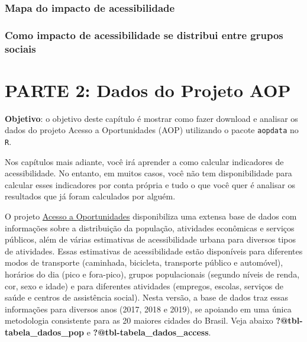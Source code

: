 \documentclass[
  letterpaper,
  DIV=11,
  numbers=noendperiod]{scrreprt}
\begin{document}
\hypertarget{mapa-do-impacto-de-acessibilidade}{%
\section{Mapa do impacto de
acessibilidade}\label{mapa-do-impacto-de-acessibilidade}}

\hypertarget{como-impacto-de-acessibilidade-se-distribui-entre-grupos-sociais}{%
\section{Como impacto de acessibilidade se distribui entre grupos
sociais}\label{como-impacto-de-acessibilidade-se-distribui-entre-grupos-sociais}}

\part{PARTE 2: Dados do Projeto AOP}

\textbf{Objetivo}: o objetivo deste capítulo é mostrar como fazer
download e analisar os dados do projeto Acesso a Oportunidades (AOP)
utilizando o pacote \texttt{aopdata} no \texttt{R}.

Nos capítulos mais adiante, você irá aprender a como calcular
indicadores de acessibilidade. No entanto, em muitos casos, você não tem
disponibilidade para calcular esses indicadores por conta própria e tudo
o que você quer é analisar os resultados que já foram calculados por
alguém.

O projeto \href{https://www.ipea.gov.br/acessooportunidades/}{Acesso a
Oportunidades} disponibiliza uma extensa base de dados com informações
sobre a distribuição da população, atividades econômicas e serviços
públicos, além de várias estimativas de acessibilidade urbana para
diversos tipos de atividades. Essas estimativas de acessibilidade estão
disponíveis para diferentes modos de transporte (caminhada, bicicleta,
transporte público e automóvel), horários do dia (pico e fora-pico),
grupos populacionais (segundo níveis de renda, cor, sexo e idade) e para
diferentes atividades (empregos, escolas, serviços de saúde e centros de
assistência social). Nesta versão, a base de dados traz essas
informações para diversos anos (2017, 2018 e 2019), se apoiando em uma
única metodologia consistente para as 20 maiores cidades do Brasil. Veja
abaixo \textbf{?@tbl-tabela\_dados\_pop} e
\textbf{?@tbl-tabela\_dados\_access}.
\end{document}
